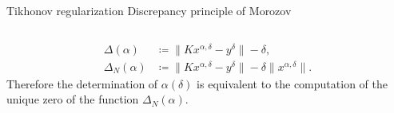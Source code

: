 \documentclass[10pt,xcolor={dvipsnames}]{beamer}
\newcommand\parallelcontent[2]{
  \begin{columns}[t]
    \column{0.48\textwidth} #1
    \column{0.48\textwidth} #2
  \end{columns}
}
\newtheorem{proposition}[subsection]{Proposition}
\theoremstyle{plain}
\theoremstyle{plain}
\begin{document}
\begin{frame}
{\begin{block}{
 \parallelcontent
 {Tikhonov regularization}{Discrepancy principle of Morozov}}
{ \begin{align}
  \Delta(\alpha)&\coloneqq\|Kx^{\alpha,\delta} - y^\delta\| - \delta, \label{eq:def-disc}\\
  \Delta_N(\alpha)&\coloneqq\|Kx^{\alpha,\delta} - y^\delta\| - \delta\|x^{\alpha,\delta}\|.\label{eq:def-disc-N}
 \end{align}
Therefore the determination of $\alpha(\delta)$ is equivalent to the computation 
of the unique zero of the function $\Delta_N(\alpha)$.
}
\end{block}
}
\end{frame}

\end{document}
